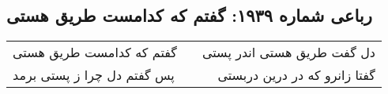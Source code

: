 \begin{center}
\section*{رباعی شماره ۱۹۳۹: گفتم که کدامست طریق هستی}
\label{sec:1939}
\begin{longtable}{l p{0.5cm} r}
گفتم که کدامست طریق هستی
&&
دل گفت طریق هستی اندر پستی
\\
پس گفتم دل چرا ز پستی برمد
&&
گفتا زانرو که در درین دربستی
\\
\end{longtable}
\end{center}
